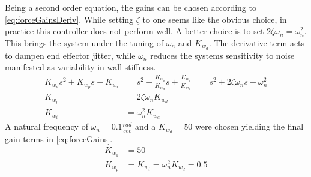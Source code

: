 \documentclass[letterpaper,12pt]{report}
\begin{document}
Being a second order equation, the gains can be chosen according to \eqref{eq:forceGainsDeriv}. While setting $\zeta$ to one seems like the obvious
choice, in practice this controller does not perform well. A better choice is to set $2\zeta\omega_n = \omega_n^2$. This brings the system under
the tuning of $\omega_n$ and $K_{w_d}$. The derivative term acts to dampen end effector jitter, while $\omega_n$ reduces the systems sensitivity to 
noise manifested as variability in wall stiffness.
\begin{subequations} \label{eq:forceGainsDeriv}
\begin{align}
	K_{w_d}s^2 + K_{w_p}s + K_{w_i} &= s^2 + \frac {K_{w_p}}{K_{w_d}} s + \frac {K_{w_i}}{K_{w_d}}
	&= s^2 + 2\zeta\omega_ns + \omega_n^2\\
	K_{w_p} &= 2\zeta\omega_nK_{w_d}\\
	K_{w_i} &= \omega_n^2K_{w_d}
\end{align}
\end{subequations}
A natural frequency of $\omega_n = 0.1 \frac{rad}{sec}$ and a $K_{w_d} = 50$ were chosen yielding the final gain terms in \eqref{eq:forceGains}.
\begin{subequations} \label{eq:forceGains}
\begin{align}
	K_{w_d} &= 50\\
	K_{w_p} &= K_{w_i} = \omega_n^2K_{w_d} = 0.5
\end{align}
\end{subequations}
\end{document}
